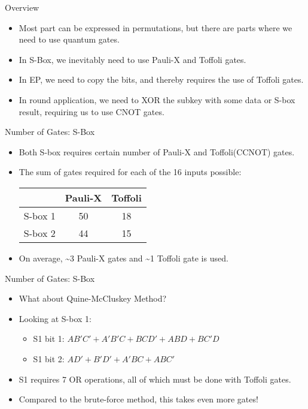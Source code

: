 \documentclass{beamer}
\begin{document}
	\begin{frame}{Overview}
		\begin{itemize}
			\item Most part can be expressed in permutations, but there are parts where we need to use quantum gates.
			\item In S-Box, we inevitably need to use Pauli-X and Toffoli gates.
			\item In EP, we need to copy the bits, and thereby requires the use of Toffoli gates.
			\item In round application, we need to XOR the subkey with some data or S-box result, requiring us to use CNOT gates.
		\end{itemize}
	\end{frame}
	
	\begin{frame}{Number of Gates: S-Box}
		\begin{itemize}
			\item Both S-box requires certain number of Pauli-X and Toffoli(CCNOT) gates.
			\item The sum of gates required for each of the 16 inputs possible:
			\begin{center}
				\begin{tabular}{c|c|c}
					        & Pauli-X & Toffoli \\\hline
					S-box 1 & 50      & 18      \\\hline
					S-box 2 & 44      & 15
				\end{tabular}
			\end{center}
			\item On average, \textasciitilde3 Pauli-X gates and \textasciitilde1 Toffoli gate is used.
		\end{itemize}
	\end{frame}
	
	\begin{frame}{Number of Gates: S-Box}
		\begin{itemize}
			\item What about Quine-McCluskey Method?
			\item Looking at S-box 1:
			\begin{itemize}
				\item S1 bit 1: $AB'C'+A'B'C+BCD'+ABD+BC'D$
				\item S1 bit 2: $AD'+B'D'+A'BC+ABC'$
			\end{itemize}
			\item S1 requires 7 OR operations, all of which must be done with Toffoli gates.
			\item Compared to the brute-force method, this takes even more gates!
		\end{itemize}
	\end{frame}
	
\end{document}
